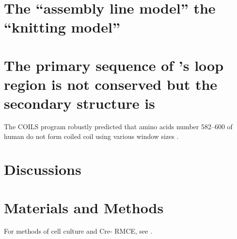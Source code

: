 \section{The ``assembly line model''  the ``knitting model''}
\label{TwoModels}


\section{The primary sequence of 's loop region is not conserved but the secondary structure is}
The COILS program robustly predicted that amino acids number 582--600 of human  do not form coiled coil using various window sizes \cite{LupasCOILS}.

\section{Discussions}


\section{Materials and Methods}
For methods of cell culture and Cre- RMCE, see .